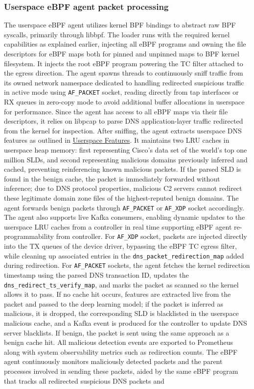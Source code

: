 \documentclass [11pt, proquest] {uwthesis}[2020/02/24]
\begin{document}
\subsubsection{\textbf{Userspace eBPF agent packet processing}}
\label{active:sec2}
The userspace eBPF agent utilizes kernel BPF bindings to abstract raw BPF syscalls, primarily through libbpf. The loader runs with the required kernel capabilities as explained earlier, injecting all eBPF programs and owning the file descriptors for eBPF maps both for pinned and unpinned maps to BPF kernel filesystem. It injects the root eBPF program powering the TC filter attached to the egress direction. The agent spawns threads to continuously sniff traffic from its owned network namespace dedicated to handling redirected suspicious traffic in active mode using \texttt{AF\_PACKET} socket, reading directly from tap interfaces or RX queues in zero-copy mode to avoid additional buffer allocations in userspace for performance. Since the agent has access to all eBPF maps via their file descriptors, it relies on libpcap to parse DNS application-layer traffic redirected from the kernel for inspection. After sniffing, the agent extracts userspace DNS features as outlined in \hyperref[sec:feature-userspace]{Userspace Features}. It maintains two LRU caches in userspace heap memory: first representing Cisco's data set of the world's top one million SLDs, and second representing malicious domains previously inferred and cached, preventing reinferencing known malicious packets. If the parsed SLD is found in the benign cache, the packet is immediately forwarded without inference; due to DNS protocol properties, malicious C2 servers cannot redirect these legitimate domain zone files of the highest-reputed benign domains. The agent forwards benign packets through \texttt{AF\_PACKET} or \texttt{AF\_XDP} socket accordingly. The agent also supports live Kafka consumers, enabling dynamic updates to the userspace LRU caches from a controller in real time supporting eBPF agent re-programmability from controller. For \texttt{AF\_XDP} socket, packets are injected directly into the TX queues of the device driver, bypassing the eBPF TC egress filter, while cleaning up associated entries in the \texttt{dns\_packet\_redirection\_map} added during redirection. For \texttt{AF\_PACKET} sockets, the agent fetches the kernel redirection timestamp using the parsed DNS transaction ID, updates the \texttt{dns\_redirect\_ts\_verify\_map}, and marks the packet as scanned so the kernel allows it to pass. If no cache hit occurs, features are extracted live from the packet and passed to the deep learning model; if the packet is inferred as malicious, it is dropped, the corresponding SLD is blacklisted in the userspace malicious cache, and a Kafka event is produced for the controller to update DNS server blacklists. If benign, the packet is sent using the same approach as a benign cache hit. All malicious detection events are exported to Prometheus along with system observability metrics such as redirection counts. The eBPF agent continuously monitors maliciously detected packets and the parent processes involved in sending these packets, aided by the same eBPF program that tracks all redirected suspicious DNS packets and 
\end{document}
